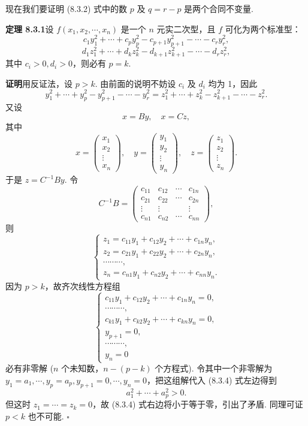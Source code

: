 \documentclass[UTF8, 12pt, fontset=fandol, oneside]{ctexart}
\begin{document}
现在我们要证明 (8.3.2) 式中的数 $p$ 及 $q=r-p$ 是两个合同不变量.

\noindent\textbf{定理 8.3.1}\quad 设 $f(x_1,x_2,\cdots,x_n)$ 是一个 $n$ 元实二次型，且 $f$ 可化为两个标准型：
\[
c_1y_1^2+\cdots+c_py_p^2-c_{p+1}y_{p+1}^2-\cdots-c_ry_r^2,
\]
\[
d_1z_1^2+\cdots+d_kz_k^2-d_{k+1}z_{k+1}^2-\cdots-d_rz_r^2,
\]
其中 $c_i>0,d_i>0$，则必有 $p=k$.

\noindent\textbf{证明}\quad 用反证法，设 $p>k$. 由前面的说明不妨设 $c_i$ 及 $d_i$ 均为 1，因此
\begin{equation}
y_1^2+\cdots+y_p^2-y_{p+1}^2-\cdots-y_r^2
=
z_1^2+\cdots+z_k^2-z_{k+1}^2-\cdots-z_r^2.
\tag{8.3.4}
\end{equation}
又设
\[
x=By,\quad x=Cz,
\]
其中
\[
x=\left(\begin{array}{c}x_1\\x_2\\\vdots\\x_n\end{array}\right),\quad
y=\left(\begin{array}{c}y_1\\y_2\\\vdots\\y_n\end{array}\right),\quad
z=\left(\begin{array}{c}z_1\\z_2\\\vdots\\z_n\end{array}\right).
\]
于是 $z=C^{-1}By$. 令
\[
C^{-1}B=\left(\begin{array}{cccc}
c_{11}&c_{12}&\cdots&c_{1n}\\
c_{21}&c_{22}&\cdots&c_{2n}\\
\vdots&\vdots&&\vdots\\
c_{n1}&c_{n2}&\cdots&c_{nn}
\end{array}\right),
\]
则
\[
\left\{\begin{array}{l}
z_1=c_{11}y_1+c_{12}y_2+\cdots+c_{1n}y_n,\\
z_2=c_{21}y_1+c_{22}y_2+\cdots+c_{2n}y_n,\\
\cdots\cdots\cdots,\\
z_n=c_{n1}y_1+c_{n2}y_2+\cdots+c_{nn}y_n.
\end{array}\right.
\]
因为 $p>k$，故齐次线性方程组
\[
\left\{\begin{array}{l}
c_{11}y_1+c_{12}y_2+\cdots+c_{1n}y_n=0,\\
\cdots\cdots\cdots,\\
c_{k1}y_1+c_{k2}y_2+\cdots+c_{kn}y_n=0,\\
y_{p+1}=0,\\
\cdots\cdots\cdots,\\
y_n=0
\end{array}\right.
\]
必有非零解 ($n$ 个未知数，$n-(p-k)$ 个方程式). 令其中一个非零解为 $y_1=a_1,\cdots,y_p=a_p,y_{p+1}=0,\cdots,y_n=0$，把这组解代入 (8.3.4) 式左边得到
\[
a_1^2+\cdots+a_p^2>0.
\]
但这时 $z_1=\cdots=z_k=0$，故 (8.3.4) 式右边将小于等于零，引出了矛盾. 同理可证 $p<k$ 也不可能. $\square$
\end{document}
